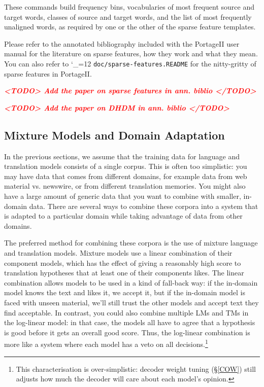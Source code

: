 \documentclass[11pt,letterpaper]{article}
\newcommand{\TODO}[1]{\emph{\textbf{\textcolor{red}{<TODO> #1 </TODO>}}}}
\newcommand{\PS}{PortageII\xspace}
\def\code{\begingroup\catcode`\_=12 \codex}
\newcommand{\codex}[1]{\texttt{#1}\endgroup}
\begin{document}
These commands build frequency bins, vocabularies of most frequent source and
target words, classes of source and target words, and the list of most
frequently unaligned words, as required by one or the other of the sparse
feature templates.

Please refer to the annotated bibliography included with the \PS user manual
for the literature on sparse features, how they work and what they mean.
You can also refer to \code{doc/sparse-features.README} for the nitty-gritty
of sparse features in \PS.

\TODO{Add the paper on sparse features in ann. biblio}

\TODO{Add the paper on DHDM in ann. biblio}

\subsection{Mixture Models and Domain Adaptation} \label{MIX}

In the previous sections, we assume that the training data for
language and translation models consists of a single corpus.  This is often too
simplistic: you may have data that comes from different domains, for example
data from web material vs. newswire, or from different translation memories.
You might also have a large amount of generic data that you want to combine
with smaller, in-domain data.  There are several ways to combine these corpora
into a system that is adapted to a particular domain while taking advantage of
data from other domains.

The preferred method for combining these corpora is the use of mixture language
and translation models.
Mixture models use a linear combination of their component models, which has
the effect of giving a reasonably high score to translation hypotheses that at least
one of their components likes.  The linear combination allows models to
be used in a kind of fall-back way: if the in-domain model knows the text and
likes it, we accept it, but if the in-domain model is faced with unseen
material, we'll still trust the other models and accept text they find
acceptable.  In contrast, you could also combine multiple LMs and TMs in the
log-linear model: in that case, the models all have to agree that a hypothesis
is good before it gets an overall good score.  Thus, the log-linear combination
is more like a system where each model has a veto on all
decisions.\footnote{This characterisation is over-simplistic: decoder weight
tuning (\S\ref{COW}) still adjusts how much the decoder will care about each
model's opinion.}
\end{document}
